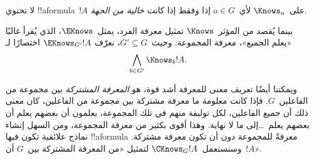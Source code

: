\documentclass[../../../include/open-logic-section]{subfiles}
\begin{document}
لا تحتوي !!a{formula}~$!A$ على~$\Knows_a$ لأي~$a \in G$ إذا وفقط إذا
كانت \emph{خالية من الجهة}.

\begin{defn}
  بينما يُقصد من المؤثر~$\Knows$ تمثيل معرفة الفرد، يمثل~$\EKnows$، الذي
  يُقرأ غالبًا «يعلم الجميع»، معرفة المجموعة. وحيث~$G' \subseteq G$، نعرّف
  $\EKnows_{G'} !A$ اختصارًا لـ
  \[\bigwedge_{b \in G'} \Knows_b !A.\]
\end{defn}

ويمكننا أيضًا تعريف معنى للمعرفة أشد قوة، هو \emph{المعرفة المشتركة} بين
مجموعة من الفاعلين~$G$. فإذا كانت معلومة ما معرفة مشتركة بين مجموعة من
الفاعلين، كان معنى ذلك أن جميع الفاعلين، لكل توليفة منهم في تلك المجموعة،
يعلمون أن بعضهم يعلم أن بعضهم يعلم~\dots إلى ما لا نهاية. وهذا أقوى بكثير
من معرفة المجموعة، ومن السهل إنشاء نماذج علائقية تكون فيها !!a{formula}
معرفةً للمجموعة دون أن تكون معرفة مشتركة. وسنستعمل~$\CKnows_G !A$ لتمثيل
«من المعرفة المشتركة بين~$G$ أن~$!A$».
\end{document}
